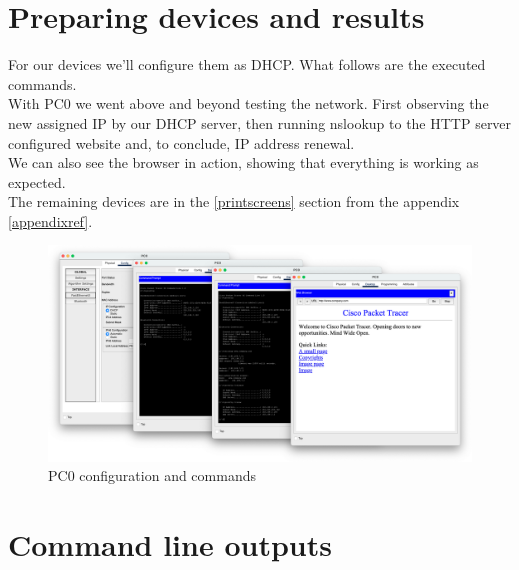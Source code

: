 \documentclass[11pt,a4paper]{report}
\begin{document}
    \section{Preparing devices and results}
        For our devices we'll configure them as DHCP. What follows are the executed commands.\\

        With PC0 we went above and beyond testing the network. First observing the new assigned IP by our DHCP server, then running nslookup to the HTTP server configured website and, to conclude, IP address renewal.\\
        We can also see the browser in action, showing that everything is working as expected.\\

        The remaining devices are in the \ref{printscreens} section from the appendix \ref{appendixref}.

        \begin{figure}[h]
            \centering
            \includegraphics[scale=0.26]{PC0}
            \caption{PC0 configuration and commands}
            \label{tab:pc0conf}
        \end{figure}

        \pagebreak

    \section{Command line outputs}
        \lstset{style=termoutputs}
        

        
\end{document}

